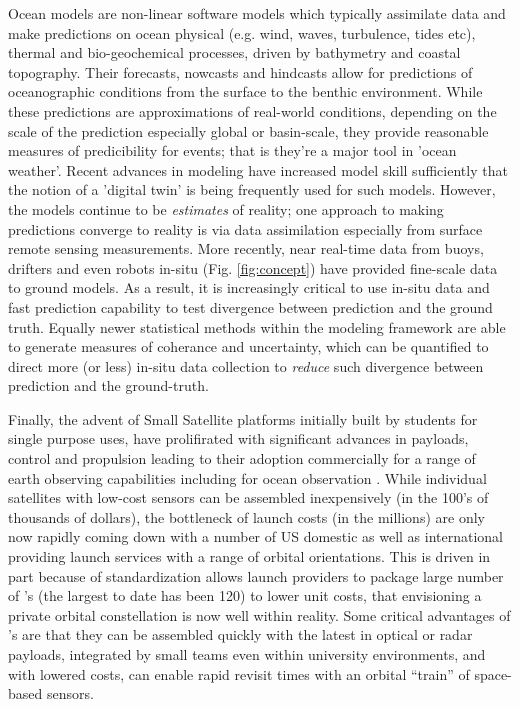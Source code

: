 Ocean models are non-linear software models which typically assimilate
data and make predictions on ocean physical (e.g. wind, waves,
turbulence, tides etc), thermal and bio-geochemical processes, driven
by bathymetry and coastal topography. Their forecasts, nowcasts and
hindcasts allow for predictions of oceanographic conditions from the
surface to the benthic environment. While these predictions are
approximations of real-world conditions, depending on the scale of the
prediction especially global or basin-scale, they provide reasonable
measures of predicibility for events; that is they're a major tool in
'ocean weather'. Recent advances in modeling have increased model
skill sufficiently that the notion of a 'digital twin' is being
frequently used for such models. However, the models continue to be
\emph{estimates} of reality; one approach to making predictions
converge to reality is via data assimilation especially from surface
remote sensing measurements. More recently, near real-time data from
buoys, drifters and even robots in-situ (Fig. \ref{fig:concept}) have
provided fine-scale data to ground models. As a result, it is
increasingly critical to use in-situ data and fast prediction
capability to test divergence between prediction and the ground
truth. Equally newer statistical methods \cite{} within the modeling
framework are able to generate measures of coherance and uncertainty,
which can be quantified to direct more (or less) in-situ data
collection to \emph{reduce} such divergence between prediction and the
ground-truth.

Finally, the advent of Small Satellite platforms initially built by
students for single purpose uses, have prolifirated with significant
advances in payloads, control and propulsion leading to their adoption
commercially for a range of earth observing capabilities including for
ocean observation \cite{}. While individual satellites with low-cost
sensors can be assembled inexpensively (in the 100's of thousands of
dollars), the bottleneck of launch costs (in the millions) are only
now rapidly coming down with a number of US domestic as well as
international providing launch services with a range of orbital
orientations. This is driven in part because of standardization allows
launch providers to package large number of \smle's (the largest to
date has been 120) to lower unit costs, that envisioning a private
orbital constellation is now well within reality. Some critical
advantages of \smle's are that they can be assembled quickly with the
latest in optical or radar payloads, integrated by small teams even
within university environments, and with lowered costs, can enable
rapid revisit times with an orbital ``train'' of space-based sensors. 

